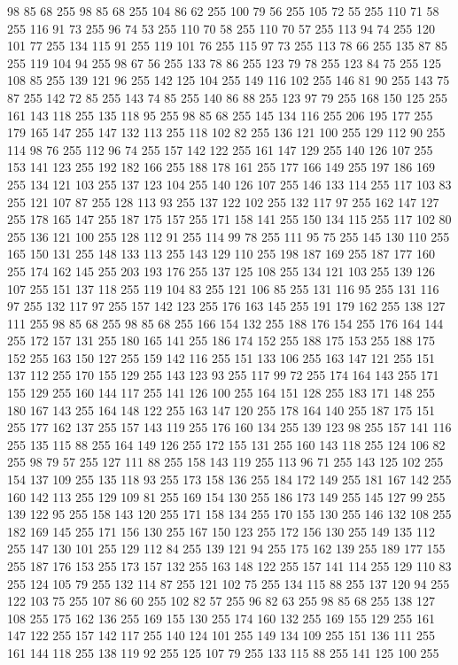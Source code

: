 98 85 68 255 98 85 68 255 104 86 62 255 100 79 56 255 105 72 55 255 110 71 58 255 116 91 73 255 96 74 53 255 110 70 58 255 110 70 57 255 113 94 74 255 120 101 77 255 134 115 91 255 119 101 76 255 115 97 73 255 113 78 66 255 135 87 85 255 119 104 94 255 98 67 56 255 133 78 86 255 123 79 78 255 123 84 75 255 125 108 85 255 139 121 96 255 142 125 104 255 149 116 102 255 146 81 90 255 143 75 87 255 142 72 85 255 143 74 85 255 140 86 88 255 123 97 79 255 168 150 125 255 161 143 118 255 135 118 95 255 98 85 68 255 145 134 116 255 206 195 177 255 179 165 147 255 147 132 113 255 118 102 82 255 136 121 100 255 129 112 90 255 114 98 76 255 112 96 74 255 157 142 122 255 161 147 129 255 140 126 107 255 153 141 123 255 192 182 166 255 188 178 161 255 177 166 149 255 197 186 169 255 134 121 103 255 137 123 104 255 140 126 107 255 146 133 114 255 117 103 83 255 121 107 87 255 128 113 93 255 137 122 102 255 132 117 97 255 162 147 127 255 178 165 147 255
187 175 157 255 171 158 141 255 150 134 115 255 117 102 80 255 136 121 100 255 128 112 91 255 114 99 78 255 111 95 75 255 145 130 110 255 165 150 131 255 148 133 113 255 143 129 110 255 198 187 169 255 187 177 160 255 174 162 145 255 203 193 176 255 137 125 108 255 134 121 103 255 139 126 107 255 151 137 118 255 119 104 83 255 121 106 85 255 131 116 95 255 131 116 97 255 132 117 97 255 157 142 123 255 176 163 145 255 191 179 162 255 138 127 111 255 98 85 68 255 98 85 68 255 166 154 132 255 188 176 154 255 176 164 144 255 172 157 131 255 180 165 141 255 186 174 152 255 188 175 153 255 188 175 152 255 163 150 127 255 159 142 116 255 151 133 106 255 163 147 121 255 151 137 112 255 170 155 129 255 143 123 93 255 117 99 72 255 174 164 143 255 171 155 129 255 160 144 117 255 141 126 100 255 164 151 128 255 183 171 148 255 180 167 143 255 164 148 122 255 163 147 120 255 178 164 140 255 187 175 151 255 177 162 137 255 157 143 119 255 176 160 134 255 139 123 98 255 157 141 116 255 135 115 88 255
164 149 126 255 172 155 131 255 160 143 118 255 124 106 82 255 98 79 57 255 127 111 88 255 158 143 119 255 113 96 71 255 143 125 102 255 154 137 109 255 135 118 93 255 173 158 136 255 184 172 149 255 181 167 142 255 160 142 113 255 129 109 81 255 169 154 130 255 186 173 149 255 145 127 99 255 139 122 95 255 158 143 120 255 171 158 134 255 170 155 130 255 146 132 108 255 182 169 145 255 171 156 130 255 167 150 123 255 172 156 130 255 149 135 112 255 147 130 101 255 129 112 84 255 139 121 94 255 175 162 139 255 189 177 155 255 187 176 153 255 173 157 132 255 163 148 122 255 157 141 114 255 129 110 83 255 124 105 79 255 132 114 87 255 121 102 75 255 134 115 88 255 137 120 94 255 122 103 75 255 107 86 60 255 102 82 57 255 96 82 63 255 98 85 68 255 138 127 108 255 175 162 136 255 169 155 130 255 174 160 132 255 169 155 129 255 161 147 122 255 157 142 117 255 140 124 101 255 149 134 109 255 151 136 111 255 161 144 118 255 138 119 92 255 125 107 79 255 133 115 88 255 141 125 100 255
